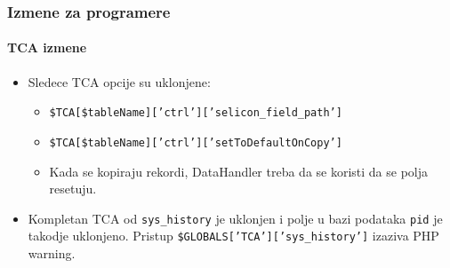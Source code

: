 
\begin{frame}[fragile]
	\frametitle{Izmene za programere}
	\framesubtitle{TCA izmene}

	\begin{itemize}
		\item Sledece TCA opcije su uklonjene:

			\begin{itemize}
				\item \texttt{\$TCA[\$tableName]['ctrl']['selicon\_field\_path']}
				\item \texttt{\$TCA[\$tableName]['ctrl']['setToDefaultOnCopy']}
			\end{itemize}

			\begin{itemize}\smaller
				\item[\ding{228}] Kada se kopiraju rekordi, DataHandler treba da se koristi da se polja resetuju.
			\end{itemize}\normalsize

		\item Kompletan TCA od \texttt{sys\_history} je uklonjen i polje u bazi podataka \texttt{pid} je takodje uklonjeno.
			Pristup \texttt{\$GLOBALS['TCA']['sys\_history']} izaziva PHP warning.

	\end{itemize}

\end{frame}


